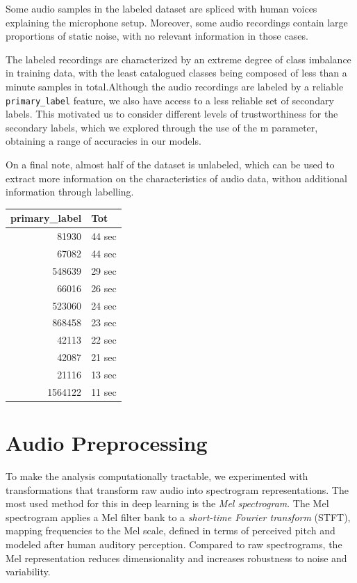\documentclass[10pt]{article}
\begin{document}
Some audio samples in the labeled dataset are spliced with human voices explaining the microphone setup. Moreover, some audio recordings contain large proportions of static noise, with no relevant information in those cases.

\begin{minipage}{0.7\linewidth}
The labeled recordings are characterized by an extreme degree of class imbalance in training data, with the least catalogued classes being composed of less than a minute samples in total.Although the audio recordings are labeled by a reliable \texttt{primary\_label} feature, we also have access to a less reliable set of secondary labels. This motivated us to consider different levels of trustworthiness for the secondary labels, which we explored through the use of the m parameter, obtaining a range of accuracies in our models.

On a final note, almost half of the dataset is unlabeled, which can be used to extract more information on the characteristics of audio data, withou additional information through labelling.
\end{minipage}
\hfill
\begin{minipage}{0.3\linewidth}
  \centering
  \begin{tabular}{|r|l|}
    \hline
    \textbf{primary\_label} & \textbf{Tot} \\
    \hline
    81930    & 44 sec \\
    67082    & 44 sec \\
    548639   & 29 sec \\
    66016    & 26 sec \\
    523060   & 24 sec \\
    868458   & 23 sec \\
    42113    & 22 sec \\
    42087    & 21 sec \\
    21116    & 13 sec \\
    1564122  & 11 sec \\
    \hline
  \end{tabular}
\end{minipage}

\section*{Audio Preprocessing}

To make the analysis computationally tractable, we experimented with transformations that transform raw audio into spectrogram representations. The most used method for this in deep learning is the \emph{Mel spectrogram}\cite{mel_cepstrum}. The Mel spectrogram applies a Mel filter bank to a \emph{short-time Fourier transform} (STFT), mapping frequencies to the Mel scale, defined in terms of perceived pitch and modeled after human auditory perception. Compared to raw spectrograms, the Mel representation reduces dimensionality and increases robustness to noise and variability. 
\end{document}
